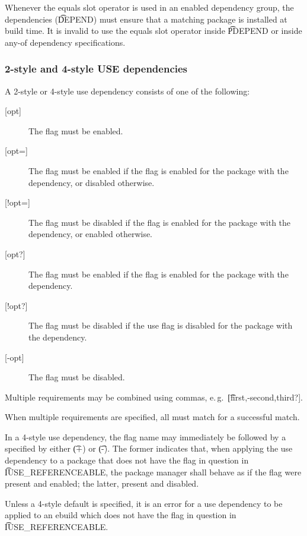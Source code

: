 Whenever the equals slot operator is used in an enabled dependency group, the dependencies
(\t{DEPEND}) must ensure that a matching package is installed at build time. It is invalid to use
the equals slot operator inside \t{PDEPEND} or inside any-of dependency specifications.

\subsubsection{2-style and 4-style USE dependencies}
\label{sec:use-dep}

A 2-style or 4-style use dependency consists of one of the following:

\begin{description}
\item[{[opt]}] The flag must be enabled.
\item[{[opt=]}] The flag must be enabled if the flag is enabled for the package with the
    dependency, or disabled otherwise.
\item[{[!opt=]}] The flag must be disabled if the flag is enabled for the package with the
    dependency, or enabled otherwise.
\item[{[opt?]}] The flag must be enabled if the flag is enabled for the package with the
    dependency.
\item[{[!opt?]}] The flag must be disabled if the use flag is disabled for the package with the
    dependency.
\item[{[-opt]}] The flag must be disabled.
\end{description}

Multiple requirements may be combined using commas, e.\,g.\ \t{[first,-second,third?]}.

When multiple requirements are specified, all must match for a successful match.

 In a 4-style use dependency, the flag name may immediately be
followed by a  specified by either \t{(+)} or \t{(-)}. The former indicates that, when
applying the use dependency to a package that does not have the flag in question in
\t{IUSE_REFERENCEABLE}, the package manager shall behave as if the flag were present and enabled;
the latter, present and disabled.

Unless a 4-style default is specified, it is an error for a use dependency to be applied to an
ebuild which does not have the flag in question in \t{IUSE_REFERENCEABLE}.


